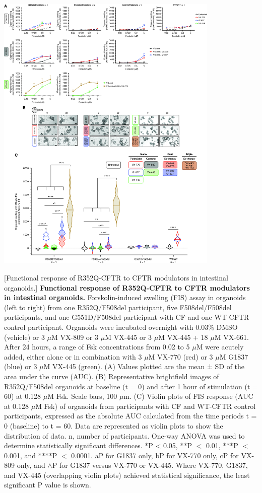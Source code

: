\begin{center}
\includegraphics[width=0.80\textwidth]{figures/R352Q/figure_2.jpg}
\end{center}
\begingroup
{}[Functional response of R352Q-CFTR to CFTR modulators in intestinal organoids.] {\textbf{Functional response of R352Q-CFTR to CFTR modulators in intestinal organoids.}}{ Forskolin-induced swelling (FIS) assay in organoids (left to right) from one R352Q/F508del participant, five F508del/F508del participants, and one G551D/F508del participant with CF and one WT-CFTR control participant. Organoids were incubated overnight with 0.03\% DMSO (vehicle) or 3 $\mu$M VX-809 or 3 $\mu$M VX-445 or 3 $\mu$M VX-445 + 18 $\mu$M VX-661. After 24 hours, a range of Fsk concentrations from 0.02 to 5 $\mu$M were acutely added, either alone or in combination with 3 $\mu$M VX-770 (red) or 3 $\mu$M G1837 (blue) or 3 $\mu$M VX-445 (green). (A) Values plotted are the mean ± SD of the area under the curve (AUC). (B) Representative brightfield images of R352Q/F508del organoids at baseline (t = 0) and after 1 hour of stimulation (t = 60) at 0.128 $\mu$M Fsk. Scale bars, 100 $\mu$m. (C) Violin plots of FIS response (AUC at 0.128 $\mu$M Fsk) of organoids from participants with CF and WT-CFTR control participants, expressed as the absolute AUC calculated from the time periods t = 0 (baseline) to t = 60. Data are represented as violin plots to show the distribution of data. n, number of participants. One-way ANOVA was used to determine statistically significant differences. *P < 0.05, **P $<$ 0.01, ***P $<$ 0.001, and ****P $<$ 0.0001. aP for G1837 only, bP for VX-770 only, cP for VX-809 only, and $\wedge$P for G1837 versus VX-770 or VX-445. Where VX-770, G1837, and VX-445 (overlapping violin plots) achieved statistical significance, the least significant P value is shown.}
\label{R352Q_figure_2}
\endgroup

